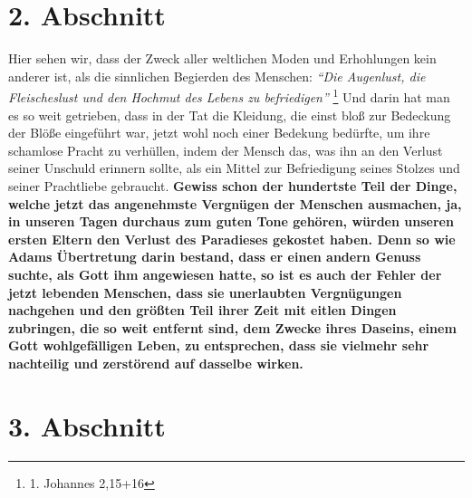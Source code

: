 \section{2. Abschnitt} \label{kap17_ab2}

Hier sehen wir, dass der Zweck aller weltlichen Moden und Erhohlungen kein
anderer ist, als die sinnlichen Begierden des Menschen:
\textit{"`Die Augenlust, die
Fleischeslust und den Hochmut des Lebens zu befriedigen"'}
\footnote{1. Johannes 2,15+16}
Und darin hat man es so weit getrieben, dass in der Tat die Kleidung, die
einst bloß zur Bedeckung der Blöße eingeführt war, jetzt wohl noch einer
Bedekung bedürfte, um ihre schamlose Pracht zu verhüllen, indem der Mensch das,
was ihn an den Verlust seiner Unschuld erinnern sollte, als ein Mittel zur
Befriedigung seines Stolzes und seiner Prachtliebe gebraucht.
\label{ref:17_02_adam_und_eva}
\textbf{Gewiss schon der
hundertste Teil der Dinge, welche jetzt das angenehmste Vergnügen der Menschen
ausmachen, ja, in unseren Tagen durchaus zum guten Tone gehören, würden unseren
ersten Eltern den Verlust des Paradieses gekostet haben. Denn so wie
Adams
Übertretung darin bestand, dass er einen andern Genuss suchte, als Gott ihm
angewiesen hatte, so ist es auch der Fehler der jetzt lebenden Menschen, dass sie
unerlaubten Vergnügungen nachgehen und den größten Teil ihrer Zeit mit eitlen
Dingen zubringen, die so weit entfernt sind, dem Zwecke ihres Daseins, einem
Gott wohlgefälligen Leben, zu entsprechen, dass sie vielmehr sehr nachteilig und
zerstörend auf dasselbe wirken.}

\section{3. Abschnitt} \label{kap17_ab3}

